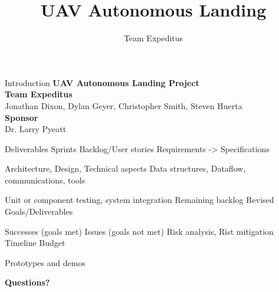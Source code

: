 \documentclass[11pt]{beamer}
\author{Team Expeditus}
\title{UAV Autonomous Landing}
\institute{SDSMT MCS}
\begin{document}
\begin{frame}
\titlepage
\end{frame}


\begin{frame}{Introduction}
\textbf{UAV Autonomous Landing Project}\\
\vspace{12mm}
\textbf{Team Expeditus}\\
Jonathan Dixon, Dylan Geyer, Christopher Smith, Steven Huerta\\ 
\vspace{6mm}
\textbf{Sponsor}\\
Dr. Larry Pyeatt\\
\end{frame}

\begin{frame}
	Deliverables
	Sprints
	Backlog/User stories
	Requirements -> Specifications
\end{frame}

\begin{frame}
	Architecture, Design, Technical aspects
	Data structures, Dataflow, communications, tools
\end{frame}

\begin{frame}
	Unit or component testing, system integration
	Remaining  backlog
	Revised Goals/Deliverables
\end{frame}

\begin{frame}
	Successes (goals met)
	Issues (goals not met)
	Risk analysis, Rist mitigation
	Timeline
	Budget
\end{frame}

\begin{frame}
	Prototypes and demos
\end{frame}

\begin{frame}
\center \Large{{\textbf{Questions?}}}
\end{frame}
\end{document}
